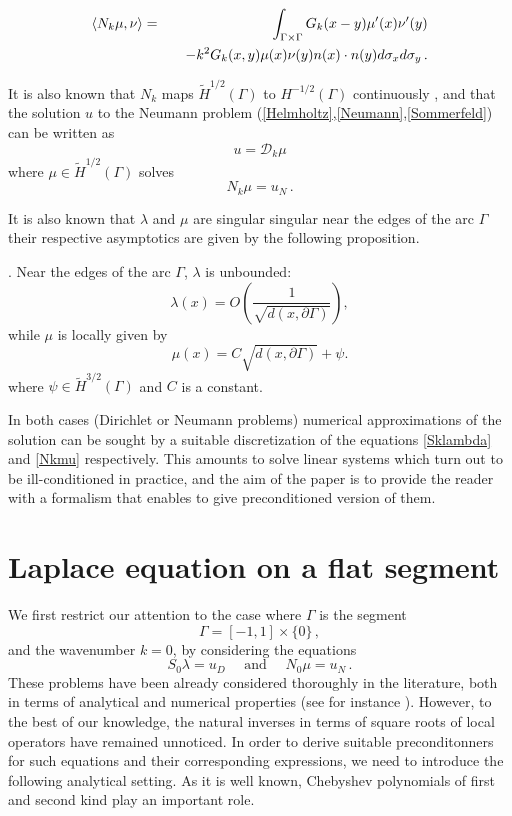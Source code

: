 \documentclass[a4paper]{subfiles}
\begin{document}
\begin{eqnarray}
\label{NkenfonctiondeSk}
\left\langle N_k \mu,\nu\right\rangle &=& \int_{\Gamma\times \Gamma} G_k(x-y) \mu'(x) \nu'(y) \nonumber\\
&& \quad - k^2 G_k(x,y) \mu(x) \nu(y) n(x) \cdot n(y) d\sigma_x d\sigma_y\,.
\end{eqnarray}


It is also known that $N_k$ maps $\tilde{H}^{1/2}(\Gamma)$ to $H^{-1/2}(\Gamma)$ continuously \cite[Theorem 1.4]{wendland1990hypersingular}, and that the solution $u$ to the Neumann 
problem (\ref{Helmholtz},\ref{Neumann},\ref{Sommerfeld}) can be written as
\begin{equation}
	u = \mathcal{D}_k \mu
\end{equation}
where $\mu \in \tilde{H}^{1/2}(\Gamma)$ solves
\begin{equation}
	N_k \mu = u_N\,.
	\label{Nkmu}
\end{equation}  

It is also known that $\lambda$ and $\mu$ are singular singular near the edges of the arc $\Gamma$ their 
respective asymptotics are given by the following proposition.
 
\begin{proposition}
\cite{stephan1984augmented,wendland1990hypersingular,monch1996numerical}.
Near the edges of the arc $\Gamma$, $\lambda$ is unbounded:
	\[\lambda(x) = O\left(\frac{1}{\sqrt{d(x,\partial \Gamma)}}\right),\]
while $\mu$ is locally given by
	\[\mu(x) = C\sqrt{d(x,\partial \Gamma)} + \psi.\]
	where $\psi \in \tilde{H}^{3/2}(\Gamma)$ and $C$ is a constant.
\end{proposition}

In both cases (Dirichlet or Neumann problems) numerical approximations of the solution can be sought by a suitable 
discretization of the equations \eqref{Sklambda} and \eqref{Nkmu} respectively. This amounts to solve linear systems
which turn out to be ill-conditioned in practice, and the aim of the paper is to provide the reader with a formalism that 
enables to give preconditioned version of them.

	
\section{Laplace equation on a flat segment}

We first restrict our attention to the case where $\Gamma$ is the segment  
\[\Gamma = [-1,1] \times \{0\}\,,\]
and the wavenumber 
$k=0$, by considering the equations 
\[S_0\lambda = u_D \quad \text{ and } \quad N_0\mu = u_N\,.\]
These problems have been already considered thoroughly in the literature, both
in terms of analytical and numerical properties (see for instance \cite{jiang2004second,bruno2012second}). However, 
to the best of our knowledge, the natural inverses in terms of square roots of local operators have remained unnoticed. 
In order to derive suitable preconditonners for such equations and their corresponding expressions, we need to introduce 
the following analytical setting. As it is well known, Chebyshev polynomials of first and second kind play an important role.
\end{document}
